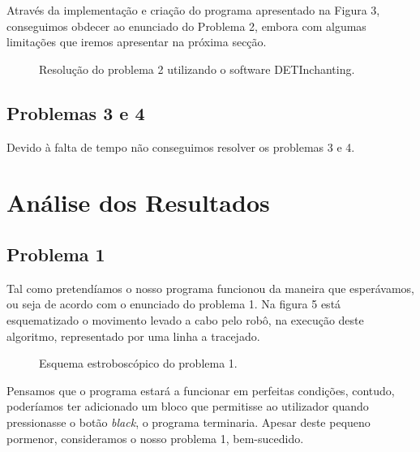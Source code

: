 \documentclass[a4paper, 12pt, onecolumn, oneside]{report}
\begin{document}
Através da implementação e criação do programa apresentado na Figura 3, conseguimos obdecer ao enunciado do Problema 2, embora com algumas limitações que iremos apresentar na próxima secção.



\begin{figure}[H]
\caption{Resolução do problema 2 utilizando o software DETInchanting.}
\label{fig:speciation}
\end{figure}






\subsection{Problemas 3 e 4}

Devido à falta de tempo não conseguimos resolver os problemas 3 e 4.






 \newpage
 






\section{Análise dos Resultados}




\subsection{Problema 1}

Tal como pretendíamos o nosso programa funcionou da maneira que esperávamos, ou seja de acordo com o enunciado do problema 1. Na figura 5 está esquematizado o movimento levado a cabo pelo robô, na execução deste algoritmo, representado por uma linha a tracejado.


\begin{figure}[H]
\caption{Esquema estroboscópico do problema 1.}
\label{fig:speciation}
\end{figure}

Pensamos que o programa estará a funcionar em perfeitas condições, contudo, poderíamos ter adicionado um bloco que permitisse ao utilizador quando pressionasse o botão \emph{black}, o programa terminaria. Apesar deste pequeno pormenor, consideramos o nosso problema 1, bem-sucedido. 
\end{document}
